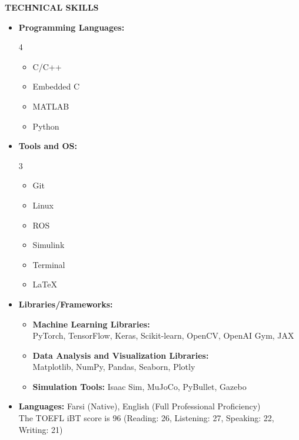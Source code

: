 \documentclass[12pt]{article}
\begin{document}
\begin{center}
	{\noindent \bfseries TECHNICAL SKILLS}
\end{center}
\vspace{-8pt}
\vspace{-8pt}
\begin{itemize} \itemsep -12pt
	\item \textbf{Programming Languages:}
	\vspace{-8pt}
	\begin{multicols}{4}
		\begin{itemize}
			\item C/C++
			\item Embedded C
			\item MATLAB
			\item Python
		\end{itemize}
	\end{multicols}
	\item \textbf{Tools and OS:}
	\vspace{-8pt}
	\begin{multicols}{3}
		\begin{itemize}
			\item Git \faGit*
			\item Linux \faLinux
			\item ROS
			\item Simulink
			\item Terminal \faTerminal
			\item \LaTeX
		\end{itemize}
	\end{multicols}
	\item \textbf{Libraries/Frameworks:}
	\vspace{-8pt}
	\begin{itemize}
		\item \textbf{Machine Learning Libraries:}\\
		PyTorch, TensorFlow, Keras, Scikit-learn, OpenCV, OpenAI Gym, JAX

		\item \textbf{Data Analysis and Visualization Libraries:}\\
		Matplotlib, NumPy, Pandas, Seaborn, Plotly

		\item \textbf{Simulation Tools:}
		Isaac Sim, MuJoCo, PyBullet, Gazebo
	\end{itemize}
	\vspace{4pt}
	\item \textbf{Languages:} Farsi (Native), English (Full Professional Proficiency)
	\vspace{1pt} \\
	The TOEFL iBT score is 96 (Reading: 26, Listening: 27, Speaking: 22, Writing: 21)
\end{itemize}
\end{document}
